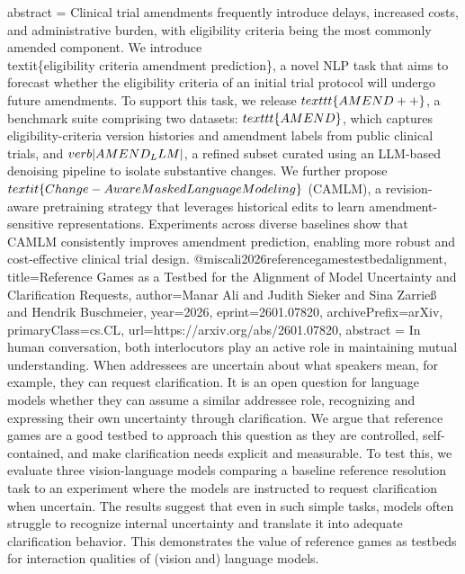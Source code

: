 {      abstract = {Clinical trial amendments frequently introduce delays, increased costs, and administrative burden, with eligibility criteria being the most commonly amended component. We introduce \\textit\{eligibility criteria amendment prediction\}, a novel NLP task that aims to forecast whether the eligibility criteria of an initial trial protocol will undergo future amendments. To support this task, we release $\\texttt\{AMEND++\}$, a benchmark suite comprising two datasets: $\\texttt\{AMEND\}$, which captures eligibility-criteria version histories and amendment labels from public clinical trials, and $\\verb|AMEND_LLM|$, a refined subset curated using an LLM-based denoising pipeline to isolate substantive changes. We further propose $\\textit\{Change-Aware Masked Language Modeling\}$ (CAMLM), a revision-aware pretraining strategy that leverages historical edits to learn amendment-sensitive representations. Experiments across diverse baselines show that CAMLM consistently improves amendment prediction, enabling more robust and cost-effective clinical trial design.}
}@misc{ali2026referencegamestestbedalignment,
      title={Reference Games as a Testbed for the Alignment of Model Uncertainty and Clarification Requests}, 
      author={Manar Ali and Judith Sieker and Sina Zarrieß and Hendrik Buschmeier},
      year={2026},
      eprint={2601.07820},
      archivePrefix={arXiv},
      primaryClass={cs.CL},
      url={https://arxiv.org/abs/2601.07820},
      abstract = {In human conversation, both interlocutors play an active role in maintaining mutual understanding. When addressees are uncertain about what speakers mean, for example, they can request clarification. It is an open question for language models whether they can assume a similar addressee role, recognizing and expressing their own uncertainty through clarification. We argue that reference games are a good testbed to approach this question as they are controlled, self-contained, and make clarification needs explicit and measurable. To test this, we evaluate three vision-language models comparing a baseline reference resolution task to an experiment where the models are instructed to request clarification when uncertain. The results suggest that even in such simple tasks, models often struggle to recognize internal uncertainty and translate it into adequate clarification behavior. This demonstrates the value of reference games as testbeds for interaction qualities of (vision and) language models.}
}

